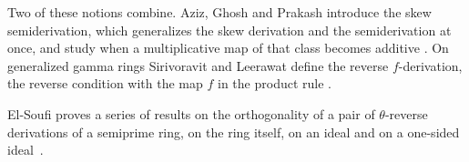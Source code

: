 Two of these notions combine. Aziz, Ghosh and Prakash introduce the skew
semiderivation, which generalizes the skew derivation and the semiderivation at
once, and study when a multiplicative map of that class becomes additive
\cite[Abstract]{AzizGhoshPrakash2024SkewSemi}. On generalized gamma rings
Sirivoravit and Leerawat define the reverse $f$-derivation, the reverse condition
with the map $f$ in the product rule \cite[Abstract]{SirivoravitLeerawat2020}.

El-Soufi proves a series of results on the orthogonality of a pair of $\theta$-reverse derivations of a semiprime ring, on the ring itself, on an ideal and on a one-sided ideal~\cite{WlSemiprimeRingsAndOrthogonality2025}.
